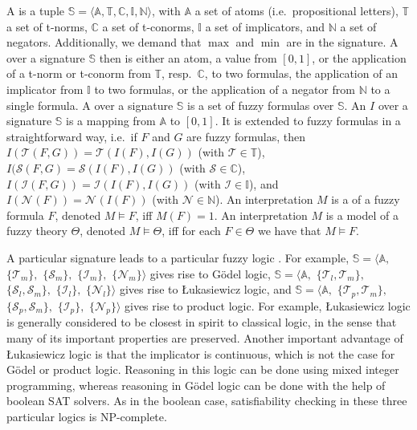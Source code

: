 \documentclass{tlp}
\newcommand{\fneg}[2]{\ensuremath{\mathcal{N}_{#1}(#2)}}
\newcommand{\pretnorm}{\mathcal{T}}
\newcommand{\pretconorm}{\mathcal{S}}
\newcommand{\prefimp}{\mathcal{I}}
\begin{document}
A  is a tuple $\mathbb{S} = \langle \mathbb{A},\mathbb{T},\mathbb{C},\mathbb{I},\mathbb{N} \rangle$, with $\mathbb{A}$ a set of atoms (i.e.~propositional letters), $\mathbb{T}$ a set of t-norms, $\mathbb{C}$ a set of t-conorms, $\mathbb{I}$ a set of implicators, and $\mathbb{N}$ a set of negators. Additionally, we demand that $\max$ and $\min$ are in the signature. A  over a signature $\mathbb{S}$ then is either an atom, a value from $[0,1]$, or the application of a t-norm or t-conorm from $\mathbb{T}$, resp.~$\mathbb{C}$, to two formulas, the application of an implicator from $\mathbb{I}$ to two formulas, or the application of a negator from $\mathbb{N}$ to a single formula. A  over a signature $\mathbb{S}$ is a set of fuzzy formulas over $\mathbb{S}$. An  $I$ over a signature $\mathbb{S}$ is a mapping from $\mathbb{A}$ to $[0,1]$. It is extended to fuzzy formulas in a straightforward way, i.e.~if $F$ and $G$ are fuzzy formulas, then $I(\pretnorm(F,G)) = \pretnorm(I(F),I(G))$ (with $\pretnorm \in \mathbb{T}$), $I(\pretconorm(F,G) = \pretconorm(I(F),I(G))$ (with $\pretconorm \in \mathbb{C}$), $I(\prefimp(F,G)) = \prefimp(I(F),I(G))$ (with $\prefimp \in \mathbb{I}$), and $I(\fneg{}{F}) = \fneg{}{I(F)}$ (with $\mathcal{N} \in \mathbb{N}$). An interpretation $M$ is a  of a fuzzy formula $F$, denoted $M \models F$, iff $M(F) = 1$. An interpretation $M$ is a model of a fuzzy theory $\Theta$, denoted $M \models \Theta$, iff for each $F \in \Theta$ we have that $M \models F$.

A particular signature leads to a particular fuzzy logic \cite{Hajek98}. For example, $\mathbb{S} = \langle \mathbb{A},$ $\{\pretnorm_m\},$ $\{\pretconorm_m\},$ $\{\prefimp_m\},$ $\{\mathcal{N}_m\} \rangle$ gives rise to G\"odel logic, $\mathbb{S} = \langle \mathbb{A},$ $\{\pretnorm_l,\pretnorm_m\},$ $\{\pretconorm_l,\pretconorm_m\},$ $\{\prefimp_l\},$ $\{\mathcal{N}_l\} \rangle$ gives rise to \L ukasiewicz logic, and $\mathbb{S} = \langle \mathbb{A},$ $\{\pretnorm_p,\pretnorm_m\},$ $\{\pretconorm_p,\pretconorm_m\},$ $\{\prefimp_p\},$ $\{\mathcal{N}_p\} \rangle$ gives rise to product logic. For example, \L ukasiewicz logic is generally considered to be closest in spirit to classical logic, in the sense that many of its important properties are preserved. Another important advantage of \L ukasiewicz logic is that the implicator is continuous, which is not the case for G\"odel or product logic. Reasoning in this logic can be done using mixed integer programming, whereas reasoning in G\"odel logic can be done with the help of boolean SAT solvers. As in the boolean case, satisfiability checking in these three particular logics is NP-complete.
\end{document}
